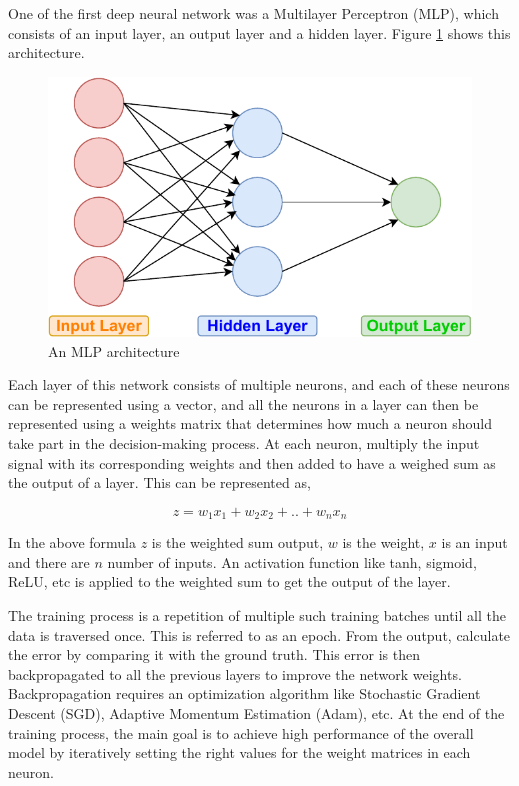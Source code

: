 One of the first deep neural network was a Multilayer Perceptron (MLP), which consists of an input layer, an output layer and a hidden layer. Figure \ref{fig:mlp} shows this architecture. 

\begin{figure}[ht]
  \begin{center}
    \includegraphics[width=\textwidth]{images/MLP.pdf} 
    \caption{An MLP architecture}
    \label{fig:mlp}
  \end{center}
\end{figure}

Each layer of this network consists of multiple neurons, and each of these neurons can be represented using a vector, and all the neurons in a layer can then be represented using a weights matrix that determines how much a neuron should take part in the decision-making process. At each neuron, multiply the input signal with its corresponding weights and then added to have a weighed sum as the output of a layer. This can be represented as,

\[ z = w_1x_1 + w_2x_2 + .. + w_nx_n \]

In the above formula $z$ is the weighted sum output, $w$ is the weight, $x$ is an input and there are $n$ number of inputs. An activation function like tanh, sigmoid, ReLU, etc is applied to the weighted sum to get the output of the layer. 

The training process is a repetition of multiple such training batches until all the data is traversed once. This is referred to as an epoch. From the output, calculate the error by comparing it with the ground truth. This error is then backpropagated to all the previous layers to improve the network weights. Backpropagation requires an optimization algorithm like Stochastic Gradient Descent (SGD), Adaptive Momentum Estimation (Adam), etc. At the end of the training process, the main goal is to achieve high performance of the overall model by iteratively setting the right values for the weight matrices in each neuron.

